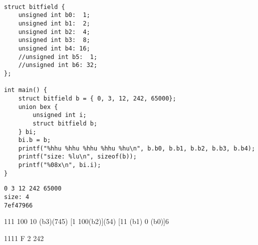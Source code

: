 \documentclass[11pt]{article}
\begin{document}
\begin{verbatim}

struct bitfield {
    unsigned int b0:  1;
    unsigned int b1:  2;
    unsigned int b2:  4;
    unsigned int b3:  8;
    unsigned int b4: 16;
    //unsigned int b5:  1;
    //unsigned int b6: 32;
};

int main() {
    struct bitfield b = { 0, 3, 12, 242, 65000};
    union bex {
        unsigned int i;
        struct bitfield b;
    } bi;
    bi.b = b;
    printf("%hhu %hhu %hhu %hhu %hu\n", b.b0, b.b1, b.b2, b.b3, b.b4);
    printf("size: %lu\n", sizeof(b));
    printf("%08x\n", bi.i);
}

\end{verbatim}

\begin{verbatim}
0 3 12 242 65000
size: 4
7ef47966
\end{verbatim}


111 100  10 (b3)(745) [1 100(b2)](54) [11 (b1)  0 (b0)]6

1111 
F 2 242
\end{document}
